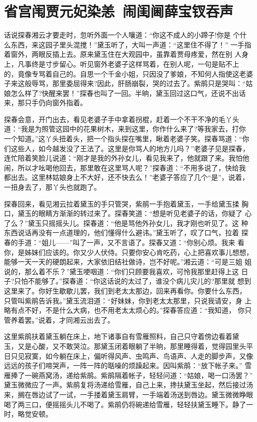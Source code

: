 \chapter{省宫闱贾元妃染恙~闹闺阃薛宝钗吞声}

话说探春湘云才要走时，忽听外面一个人嚷道：“你这不成人的小蹄子!你是
个什么东西，来这园子里头混搅！”黛玉听了，大叫一声道：“这里住不得了！”
一手指着窗外，两眼反插上去。原来黛玉住在大观园中，虽靠着贾母疼爱，然在别
人身上，凡事终是寸步留心。听见窗外老婆子这样骂着，在别人呢，一句是贴不上
的，竟像专骂着自己的。自思一个千金小姐，只因没了爹娘，不知何人指使这老婆
子来这般辱骂，那里委屈得来?因此，肝肠崩裂，哭的过去了。紫鹃只是哭叫：“姑
娘怎么样了?快醒来罢！”探春也叫了一回。半晌，黛玉回过这口气，还说不出话
来，那只手仍向窗外指着。

探春会意，开门出去，看见老婆子手中拿着拐棍，赶着一个不干不净的毛丫头
道：“我是为照管这园中的花果树木，来到这里，你作什么来了?等我家去，打你
一个知道。”这丫头扭着头，把一个指头探在嘴里，瞅着老婆子笑。探春骂道：“你
们这些人，如今越发没了王法了。这里是你骂人的地方儿吗？”老婆子见是探春，
连忙陪着笑脸儿说道：“刚才是我的外孙女儿，看见我来了，他就跟了来。我怕他
闹，所以才吆喝他回去，那里敢在这里骂人呢？”探春道：“不用多说了，快给我
都出去。这里林姑娘身上不大好，还不快去么！”老婆子答应了几个“是”，说着，
一扭身去了，那丫头也就跑了。

探春回来，看见湘云拉着黛玉的手只管哭，紫鹃一手抱着黛玉，一手给黛玉揉
胸口，黛玉的眼睛方渐渐的转过来了。探春笑道：“想是听见老婆子的话，你疑了
心了么？”黛玉只摇摇头儿。探春道：“他是骂他外孙女儿，我才刚也听见了。这
种东西说话再没有一点道理的，他们懂得什么避讳。”黛玉听了，叹了口气，拉着
探春的手道：“姐儿——”叫了一声，又不言语了。探春又道：“你别心烦。我来
看你，是姊妹们应该的。你又少人伏侍。只要你安心肯吃药，心上把喜欢事儿想想，
能够一天一天的硬朗起来，大家依旧结社做诗，岂不好呢。”湘云道：“可是三姐
姐说的，那么着不乐？”黛玉哽咽道：“你们只顾要我喜欢，可怜我那里赶得上这
日子?只怕不能够了。”探春道：“你这话说的太过了，谁没个病儿灾儿的?那里就
想到这里来了。你好生歇歇儿罢，我们到老太太那边，回来再看你。你要什么东西，
只管叫紫鹃告诉我。”黛玉流泪道：“好妹妹，你到老太太那里，只说我请安，身
上略有点不好，不是什么大病，也不用老太太烦心的。”探春答应道：“我知道，
你只管养着罢。”说着，才同湘云出去了。

这里紫鹃扶着黛玉躺在床上，地下诸事自有雪雁照料，自己只守着傍边看着黛
玉，又是心酸，又不敢哭泣。那黛玉闭着眼躺了半晌，那里睡得着，觉得园里头平
日只见寂寞，如今躺在床上，偏听得风声、虫鸣声、鸟语声、人走的脚步声，又像
远远的孩子们啼哭声，一阵一阵的聒噪的烦躁起来。因叫紫鹃：“放下帐子来。”
雪雁捧了一碗燕窝汤，递给紫鹃。紫鹃隔着帐子，轻轻问道：“姑娘，喝一口汤罢？”
黛玉微微应了一声。紫鹃复将汤递给雪雁，自己上来，搀扶黛玉坐起，然后接过汤
来，搁在唇边试了一试，一手搂着黛玉肩臂，一手端着汤送到唇边。黛玉微微睁眼
喝了两三口，便摇摇头儿不喝了。紫鹃仍将碗递给雪雁，轻轻扶黛玉睡下。静了一
时，略觉安顿。

